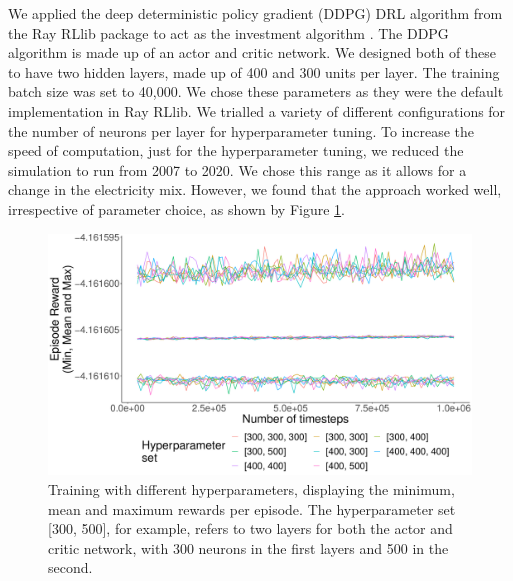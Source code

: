 \documentclass{article}
\begin{document}
We applied the deep deterministic policy gradient (DDPG) DRL algorithm \cite{Hunt2016a} from the Ray RLlib package to act as the investment algorithm \cite{Liang2014}. The DDPG algorithm is made up of an actor and critic network. We designed both of these to have two hidden layers, made up of 400 and 300 units per layer. The training batch size was set to 40,000. We chose these parameters as they were the default implementation in Ray RLlib. We trialled a variety of different configurations for the number of neurons per layer for hyperparameter tuning. To increase the speed of computation, just for the hyperparameter tuning, we reduced the simulation to run from 2007 to 2020. We chose this range as it allows for a change in the electricity mix. However, we found that the approach worked well, irrespective of parameter choice, as shown by Figure \ref{fig:hyperparameter_training}. %





\begin{figure}
\centering
\includegraphics[width=0.56\columnwidth]{figures/hyperparameter_plot_params.pdf}
\caption{Training with different hyperparameters, displaying the minimum, mean and maximum rewards per episode. The hyperparameter set [300, 500], for example, refers to two layers for both the actor and critic network, with 300 neurons in the first layers and 500 in the second.}
\label{fig:hyperparameter_training}
\end{figure}





\end{document}
